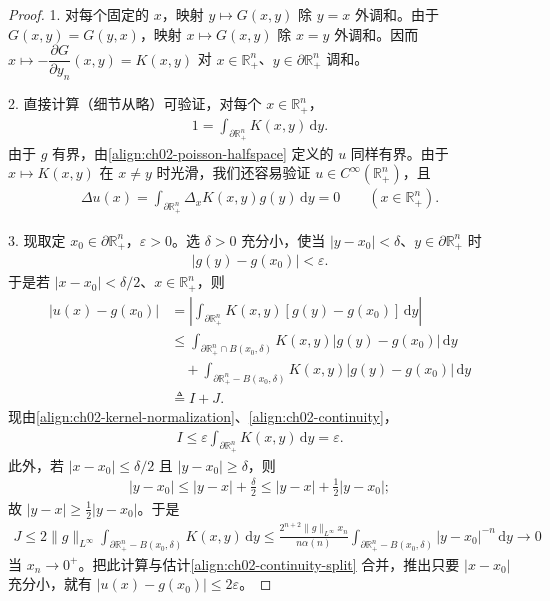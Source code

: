 \documentclass[../../main.tex]{subfiles}
\begin{document}
\begin{proof}
1. 对每个固定的 $x$，映射 $y\mapsto G(x,y)$ 除 $y=x$ 外调和。由于 $G(x,y)=G(y,x)$，映射 $x\mapsto G(x,y)$ 除 $x=y$ 外调和。因而 $x\mapsto-\dfrac{\partial G}{\partial y_n}(x,y)=K(x,y)$ 对 $x\in\mathbb{R}^n_+$、$y\in\partial\mathbb{R}^n_+$ 调和。

2. 直接计算（细节从略）可验证，对每个 $x\in\mathbb{R}^n_+$，
\begin{align}\label{align:ch02-kernel-normalization}
1=\int_{\partial\mathbb{R}^n_+}K(x,y)\,\mathrm{d}y.
\end{align}
由于 $g$ 有界，由\eqref{align:ch02-poisson-halfspace} 定义的 $u$ 同样有界。由于 $x\mapsto K(x,y)$ 在 $x\neq y$ 时光滑，我们还容易验证 $u\in C^\infty(\mathbb{R}^n_+)$，且
\begin{align*}
\Delta u(x)=\int_{\partial\mathbb{R}^n_+}\Delta_x K(x,y)g(y)\,\mathrm{d}y=0 \qquad (x\in\mathbb{R}^n_+).
\end{align*}

3. 现取定 $x_0\in\partial\mathbb{R}^n_+$，$\varepsilon>0$。选 $\delta>0$ 充分小，使当 $|y-x_0|<\delta$、$y\in\partial\mathbb{R}^n_+$ 时
\begin{align}\label{align:ch02-continuity}
|g(y)-g(x_0)|<\varepsilon.
\end{align}
于是若 $|x-x_0|<\delta/2$、$x\in\mathbb{R}^n_+$，则
\begin{align}\label{align:ch02-continuity-split}
|u(x)-g(x_0)|&=\left|\int_{\partial\mathbb{R}^n_+}K(x,y)[g(y)-g(x_0)]\,\mathrm{d}y\right|\\
&\leqslant\int_{\partial\mathbb{R}^n_+\cap B(x_0,\delta)}K(x,y)|g(y)-g(x_0)|\,\mathrm{d}y\nonumber\\
&\quad+\int_{\partial\mathbb{R}^n_+-B(x_0,\delta)}K(x,y)|g(y)-g(x_0)|\,\mathrm{d}y\nonumber\\
&\triangleq I+J.\nonumber
\end{align}
现由\eqref{align:ch02-kernel-normalization}、\eqref{align:ch02-continuity}，
\begin{align*}
I\leqslant\varepsilon\int_{\partial\mathbb{R}^n_+}K(x,y)\,\mathrm{d}y=\varepsilon.
\end{align*}
此外，若 $|x-x_0|\leqslant\delta/2$ 且 $|y-x_0|\geqslant\delta$，则
\begin{align*}
|y-x_0|\leqslant|y-x|+\frac{\delta}{2}\leqslant|y-x|+\frac{1}{2}|y-x_0|;
\end{align*}
故 $|y-x|\geqslant\frac{1}{2}|y-x_0|$。于是
\begin{align*}
J\leqslant 2\|g\|_{L^\infty}\int_{\partial\mathbb{R}^n_+-B(x_0,\delta)}K(x,y)\,\mathrm{d}y
\leqslant\frac{2^{n+2}\|g\|_{L^\infty}x_n}{n\alpha(n)}\int_{\partial\mathbb{R}^n_+-B(x_0,\delta)}|y-x_0|^{-n}\,\mathrm{d}y\to 0
\end{align*}
当 $x_n\to 0^+$。把此计算与估计\eqref{align:ch02-continuity-split} 合并，推出只要 $|x-x_0|$ 充分小，就有 $|u(x)-g(x_0)|\leqslant 2\varepsilon$。
\end{proof}
\end{document}
